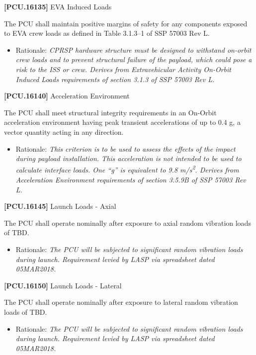 \textbf{[PCU.16135]} EVA Induced Loads

The \gls{PCU} shall maintain positive margins of safety for any components exposed to EVA crew loads as defined in Table 3.1.3--1 of SSP 57003 Rev L.

\begin{itemize}
\item{} Rationale: \emph{CPRSP hardware structure must be designed to withstand on-orbit crew loads and to prevent structural failure of the payload, which could pose a risk to the ISS or crew. Derives from Extravehicular Activity On-Orbit Induced Loads requirements of section 3.1.3 of SSP 57003 Rev L.}

\end{itemize}

\textbf{[PCU.16140]} Acceleration Environment

The \gls{PCU} shall meet structural integrity requirements in an On-Orbit acceleration environment having peak transient accelerations of up to 0.4 g, a vector quantity acting in any direction.

\begin{itemize}
\item{} Rationale: \emph{This criterion is to be used to assess the effects of the impact during payload installation. This acceleration is not intended to be used to calculate interface loads. One ``g'' is equivalent to 9.8 m\slash s\textsuperscript{2}. Derives from Acceleration Environment requirements of section 3.5.9B of SSP 57003 Rev L.}

\end{itemize}

\textbf{[PCU.16145]} Launch Loads - Axial

The \gls{PCU} shall operate nominally after exposure to axial random vibration loads of TBD\label{tbx_14}.

\begin{itemize}
\item{} Rationale: \emph{The PCU will be subjected to significant random vibration loads during launch. Requirement levied by LASP via spreadsheet dated 05MAR2018.}

\end{itemize}

\textbf{[PCU.16150]} Launch Loads - Lateral

The \gls{PCU} shall operate nominally after exposure to lateral random vibration loads of TBD\label{tbx_15}.

\begin{itemize}
\item{} Rationale: \emph{The PCU will be subjected to significant random vibration loads during launch. Requirement levied by LASP via spreadsheet dated 05MAR2018.}

\end{itemize}

